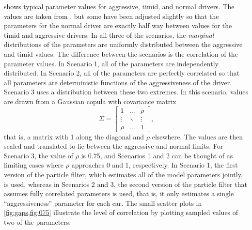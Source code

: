 shows typical parameter values for aggressive, timid, and normal drivers.
The values are taken from \citet{kesting2009agents}, but some have been adjusted slightly so that the parameters for the normal driver are exactly half way between values for the timid and aggressive drivers.
In all three of the scenarios, the \emph{marginal} distributions of the parameters are uniformly distributed between the aggressive and timid values.
The difference between the scenarios is the correlation of the parameter values.
In Scenario 1, all of the parameters are independently distributed.
In Scenario 2, all of the parameters are perfectly correlated so that all parameters are deterministic functions of the aggressiveness of the driver.
Scenario 3 uses a distribution between these two extremes.
In this scenario, values are drawn from a Gaussian copula with covariance matrix
\begin{equation}
    \Sigma = \begin{bmatrix}
        1 & \dots & \rho \\
        \vdots & \ddots & \vdots \\
        \rho & \dots & 1
    \end{bmatrix}\text{,}
\end{equation}
that is, a matrix with 1 along the diagonal and $\rho$ elsewhere.
The values are then scaled and translated to lie between the aggressive and normal limits.
For Scenario 3, the value of $\rho$ is \num{0.75}, and Scenarios 1 and 2 can be thought of as limiting cases where $\rho$ approaches 0 and 1, respectively.
In Scenario 1, the first version of the particle filter, which estimates all of the model parameters jointly, is used, whereas in Scenarios 2 and 3, the second version of the particle filter that assumes fully correlated parameters is used, that is, it only estimates a single ``aggressiveness'' parameter for each car.
The small scatter plots in \cref{fig:gaps,fig:075} illustrate the level of correlation by plotting sampled values of two of the parameters.

